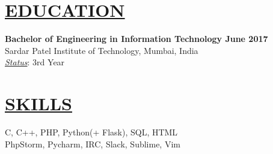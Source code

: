 \documentclass[margin]{res}
\begin{document}
\begin{resume}

\noindent\makebox[\linewidth]{\rule{\paperwidth}{0.4pt}}
\section{\underline{EDUCATION}}
\textbf{Bachelor of Engineering in Information Technology \hfill June 2017}\\
{Sardar Patel Institute of Technology, Mumbai, India}\\
{\sl \underline{Status}}: 3rd Year 

\vspace{-4mm}
\section{\underline{SKILLS}}
C, C++, PHP, Python(+ Flask), SQL, HTML\\
PhpStorm, Pycharm, IRC, Slack, Sublime, Vim
\vspace{-4mm}

\end{resume}
\end{document}
